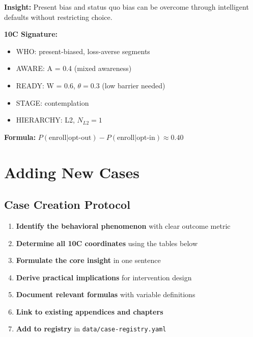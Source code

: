 \begin{tcolorbox}[colback=green!5, colframe=green!50, title=Default Nudge]
\textbf{Insight:} Present bias and status quo bias can be overcome through intelligent defaults without restricting choice.

\textbf{10C Signature:}
\begin{itemize}
    \item WHO: present-biased, loss-averse segments
    \item AWARE: A = 0.4 (mixed awareness)
    \item READY: W = 0.6, $\theta = 0.3$ (low barrier needed)
    \item STAGE: contemplation
    \item HIERARCHY: L2, $N_{L2} = 1$
\end{itemize}

\textbf{Formula:} $P(\text{enroll}|\text{opt-out}) - P(\text{enroll}|\text{opt-in}) \approx 0.40$
\end{tcolorbox}

\section{Adding New Cases}

\subsection{Case Creation Protocol}

\begin{enumerate}
    \item \textbf{Identify the behavioral phenomenon} with clear outcome metric
    \item \textbf{Determine all 10C coordinates} using the tables below
    \item \textbf{Formulate the core insight} in one sentence
    \item \textbf{Derive practical implications} for intervention design
    \item \textbf{Document relevant formulas} with variable definitions
    \item \textbf{Link to existing appendices and chapters}
    \item \textbf{Add to registry} in \texttt{data/case-registry.yaml}
\end{enumerate}

